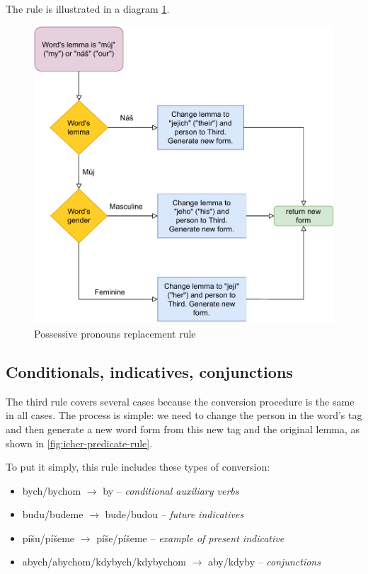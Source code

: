 The rule is illustrated in a diagram \ref{fig:icher-posspron-rule}.

\begin{figure}[!htbp]
\includegraphics[width=\textwidth]{data/Icher-Posspron-Rule.pdf}
\caption{Possessive pronouns replacement rule}
\label{fig:icher-posspron-rule}
\end{figure}

\subsection{Conditionals, indicatives, conjunctions}

The third rule covers several cases because the conversion procedure is the same in all cases. The process is simple: we need to change the person in the word's tag and then generate a new word form from this new tag and the original lemma, as shown in \ref{fig:icher-predicate-rule}.

To put it simply, this rule includes these types of conversion:
\begin{itemize}
	\item bych/bychom $\rightarrow$ by -- \emph{conditional auxiliary verbs}
	\item budu/budeme $\rightarrow$ bude/budou -- \emph{future indicatives}
	\item píšu/píšeme $\rightarrow$ píše/píšeme -- \emph{example of present indicative}
	\item abych/abychom/kdybych/kdybychom $\rightarrow$ aby/kdyby -- \emph{conjunctions}
\end{itemize}


